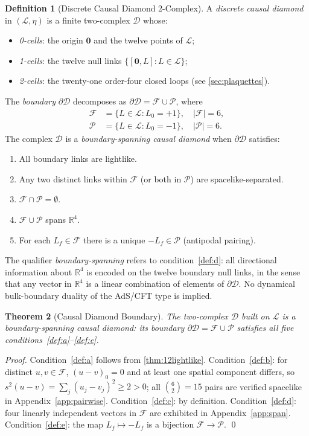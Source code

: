 \documentclass[12pt, a4paper]{article}
\theoremstyle{plain}
\newtheorem{theorem}{Theorem}[section]
\theoremstyle{definition}
\newtheorem{definition}[theorem]{Definition}
\theoremstyle{remark}
\newcommand{\Lat}{\mathscr{L}}
\newcommand{\CD}{\mathscr{D}}
\newcommand{\BdyCD}{\partial\mathscr{D}}
\newcommand{\LL}{\mathcal{L}}
\newcommand{\FS}{\mathcal{F}}
\newcommand{\PS}{\mathcal{P}}
\newcommand{\ssp}{s^2}
\newcommand{\R}{\mathbb{R}}
\begin{document}
\begin{definition}[Discrete Causal Diamond 2-Complex]\label{def:diamond}
A \emph{discrete causal diamond} in $(\Lat,\eta)$ is a finite
two-complex $\CD$ whose:
\begin{itemize}[noitemsep]
  \item \emph{0-cells}: the origin $\bm{0}$ and the twelve points of $\LL$;
  \item \emph{1-cells}: the twelve null links $\{[\bm{0},L]:L\in\LL\}$;
  \item \emph{2-cells}: the twenty-one order-four closed loops
    (see \cref{sec:plaquettes}).
\end{itemize}
The \emph{boundary} $\BdyCD$ decomposes as
$\BdyCD = \FS \cup \PS$, where
\begin{align*}
  \FS &= \{L\in\LL : L_0=+1\}, \quad |\FS|=6,\\
  \PS &= \{L\in\LL : L_0=-1\}, \quad |\PS|=6.
\end{align*}
The complex $\CD$ is a \emph{boundary-spanning causal diamond}
when $\BdyCD$ satisfies:
\begin{enumerate}[label=(\alph*), noitemsep]
  \item\label{def:a} All boundary links are lightlike.
  \item\label{def:b} Any two distinct links within $\FS$ (or
    both in $\PS$) are spacelike-separated.
  \item\label{def:c} $\FS\cap\PS = \emptyset$.
  \item\label{def:d} $\FS\cup\PS$ spans $\R^4$.
  \item\label{def:e} For each $L_f\in\FS$ there is a unique
    $-L_f\in\PS$ (antipodal pairing).
\end{enumerate}
The qualifier \emph{boundary-spanning} refers to condition~\ref{def:d}:
all directional information about $\R^4$ is encoded on the
twelve boundary null links, in the sense that any vector in
$\R^4$ is a linear combination of elements of $\BdyCD$.
No dynamical bulk-boundary duality of the AdS/CFT type is implied.
\end{definition}

\begin{theorem}[Causal Diamond Boundary]\label{thm:diamond}
The two-complex $\CD$ built on $\LL$ is a boundary-spanning causal
diamond: its boundary $\BdyCD = \FS\cup\PS$ satisfies all
five conditions~\ref{def:a}--\ref{def:e}.
\end{theorem}

\begin{proof}
Condition~\ref{def:a} follows from \cref{thm:12lightlike}.
Condition~\ref{def:b}: for distinct $u,v\in\FS$,
$(u-v)_0=0$ and at least one spatial component differs, so
$\ssp(u-v) = \sum_j(u_j-v_j)^2 \geq 2 > 0$;
all $\binom{6}{2}=15$ pairs are verified spacelike
in Appendix~\ref{app:pairwise}.
Condition~\ref{def:c}: by definition.
Condition~\ref{def:d}: four linearly independent vectors in $\FS$
are exhibited in Appendix~\ref{app:span}.
Condition~\ref{def:e}: the map $L_f\mapsto -L_f$ is a bijection
$\FS\to\PS$.
\qed
\end{proof}
\end{document}
